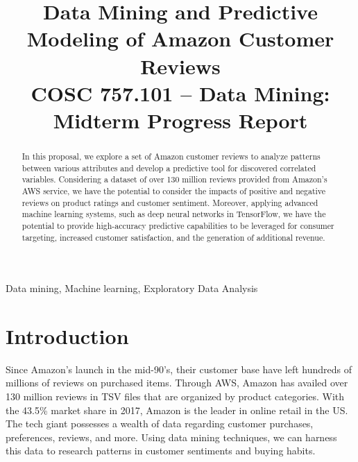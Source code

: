 \documentclass[10pt, conference, compsocconf]{IEEEtran}
\begin{document}
\title{Data Mining and Predictive Modeling of Amazon Customer Reviews \\ {\large COSC 757.101 – Data Mining:  Midterm Progress Report}}

\newcommand{\superast}{\raisebox{9pt}{$\ast$}}
\newcommand{\superdagger}{\raisebox{9pt}{$\dagger$}}
\newcommand{\superddagger}{\raisebox{9pt}{$\ddagger$}}
\newcommand{\superS}{\raisebox{9pt}{$\S$}}
\newcommand{\superP}{\raisebox{9pt}{$\P$}}

\author{
}

\maketitle

\begin{abstract}
In this proposal, we explore a set of Amazon customer reviews to analyze patterns between various attributes and develop a predictive tool for discovered correlated variables. Considering a dataset of over 130 million reviews provided from Amazon's AWS service, we have the potential to consider the impacts of positive and negative reviews on product ratings and customer sentiment. Moreover, applying advanced machine learning systems, such as deep neural networks in TensorFlow, we have the potential to provide high-accuracy predictive capabilities to be leveraged for consumer targeting, increased customer satisfaction, and the generation of additional revenue. 

\end{abstract}

\begin{IEEEkeywords}
Data mining, Machine learning, Exploratory Data Analysis
\end{IEEEkeywords}

\section{Introduction}\label{intro}

Since Amazon’s launch in the mid-90’s, their customer base have left hundreds of millions of reviews on purchased items. Through AWS, Amazon has availed over 130 million reviews in TSV files that are organized by product categories. With the 43.5\% market share in 2017, Amazon is the leader in online retail in the US. The tech giant possesses a wealth of data regarding customer purchases, preferences, reviews, and more. Using data mining techniques, we can harness this data to research patterns in customer sentiments and buying habits.
\end{document}
